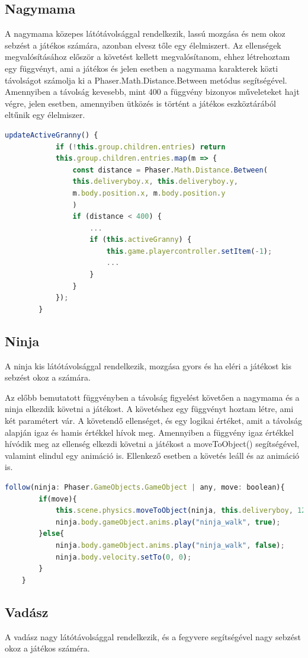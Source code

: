 \documentclass[12pt, a4paper]{report}
\theoremstyle{definition}
\begin{document}
	
	\subsection{Nagymama}
	A nagymama közepes látótávolsággal rendelkezik, lassú mozgása és nem okoz sebzést a játékos számára, azonban elvesz tőle egy élelmiszert.
	Az ellenségek megvalósításához először a követést kellett megvalósítanom, ehhez létrehoztam egy függvényt, ami a játékos és jelen esetben a nagymama karakterek közti távolságot számolja ki a Phaser.Math.Distance.Between metódus segítségével. Amennyiben a távolság kevesebb, mint 400 a függvény bizonyos műveleteket hajt végre, jelen esetben, amennyiben ütközés is történt a játékos eszköztárából eltűnik egy élelmiszer. 
	\begin{lstlisting}[language=JavaScript]
		updateActiveGranny() {
			if (!this.group.children.entries) return
			this.group.children.entries.map(m => {
				const distance = Phaser.Math.Distance.Between(
				this.deliveryboy.x, this.deliveryboy.y,
				m.body.position.x, m.body.position.y
				)  
				if (distance < 400) {
					...
					if (this.activeGranny) {
						this.game.playercontroller.setItem(-1);
						...
					}
				}
			});
		}
	\end{lstlisting}

	\subsection{Ninja}
	A ninja kis látótávolsággal rendelkezik, mozgása gyors és ha eléri a játékost kis sebzést okoz a számára.
	
	Az előbb bemutatott függvényben a távolság figyelést követően a nagymama és a ninja elkezdik követni a játékost. A követéshez egy függvényt hoztam létre, ami két paramétert vár. A követendő ellenséget, és egy logikai értéket, amit a távolság alapján igaz és hamis értékkel hívok meg. Amennyiben a függvény igaz értékkel hívódik meg az ellenség elkezdi követni a játékost a moveToObject() segítségével, valamint elindul egy animáció is. Ellenkező esetben a követés leáll és az animáció is.
	\begin{lstlisting}[language=JavaScript]
	follow(ninja: Phaser.GameObjects.GameObject | any, move: boolean){
		if(move){
			this.scene.physics.moveToObject(ninja, this.deliveryboy, 120);
			ninja.body.gameObject.anims.play("ninja_walk", true);
		}else{
			ninja.body.gameObject.anims.play("ninja_walk", false);
			ninja.body.velocity.setTo(0, 0);
		}
	}
	\end{lstlisting}
	\subsection{Vadász}
	A vadász nagy látótávolsággal rendelkezik, és a fegyvere segítségével nagy sebzést okoz a játékos száméra.
	
\end{document}

